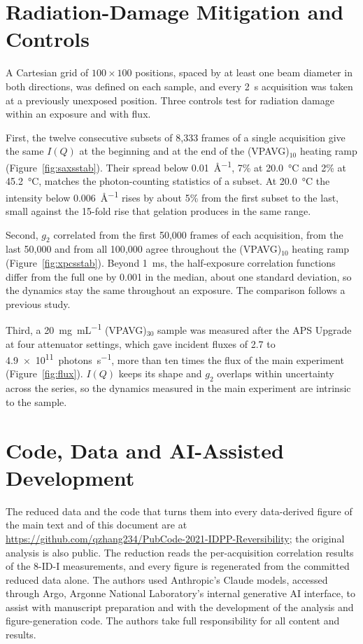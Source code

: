\documentclass[11pt]{article}
\newcommand{\VP}[1]{(VPAVG)$_{#1}$}
\begin{document}
\section{Radiation-Damage Mitigation and Controls}

A Cartesian grid of $100\times100$ positions, spaced by at least one beam diameter in both directions, was defined on each sample, and every \SI{2}{\second} acquisition was taken at a previously unexposed position. Three controls test for radiation damage within an exposure and with flux.

First, the twelve consecutive subsets of 8{,}333 frames of a single acquisition give the same $I(Q)$ at the beginning and at the end of the \VP{10} heating ramp (Figure~\ref{fig:saxsstab}). Their spread below \SI{0.01}{\angstrom^{-1}}, 7\% at \SI{20.0}{\degreeCelsius} and 2\% at \SI{45.2}{\degreeCelsius}, matches the photon-counting statistics of a subset. At \SI{20.0}{\degreeCelsius} the intensity below \SI{0.006}{\angstrom^{-1}} rises by about 5\% from the first subset to the last, small against the 15-fold rise that gelation produces in the same range.

Second, $g_2$ correlated from the first 50{,}000 frames of each acquisition, from the last 50{,}000 and from all 100{,}000 agree throughout the \VP{10} heating ramp (Figure~\ref{fig:xpcsstab}). Beyond \SI{1}{\milli\second}, the half-exposure correlation functions differ from the full one by 0.001 in the median, about one standard deviation, so the dynamics stay the same throughout an exposure. The comparison follows a previous study.\cite{Switalski2022-ig}

Third, a \SI{20}{\milli\gram\per\milli\liter} \VP{30} sample was measured after the APS Upgrade at four attenuator settings, which gave incident fluxes of 2.7 to \SI{4.9e11}{photons\per\second}, more than ten times the flux of the main experiment (Figure~\ref{fig:flux}). $I(Q)$ keeps its shape and $g_2$ overlaps within uncertainty across the series, so the dynamics measured in the main experiment are intrinsic to the sample.

\section{Code, Data and AI-Assisted Development}

The reduced data and the code that turns them into every data-derived figure of the main text and of this document are at \url{https://github.com/qzhang234/PubCode-2021-IDPP-Reversibility}; the original analysis is also public.\cite{Chu2023-xx} The reduction reads the per-acquisition correlation results of the 8-ID-I measurements, and every figure is regenerated from the committed reduced data alone. The authors used Anthropic's Claude models, accessed through Argo, Argonne National Laboratory's internal generative AI interface, to assist with manuscript preparation and with the development of the analysis and figure-generation code. The authors take full responsibility for all content and results.
\end{document}
